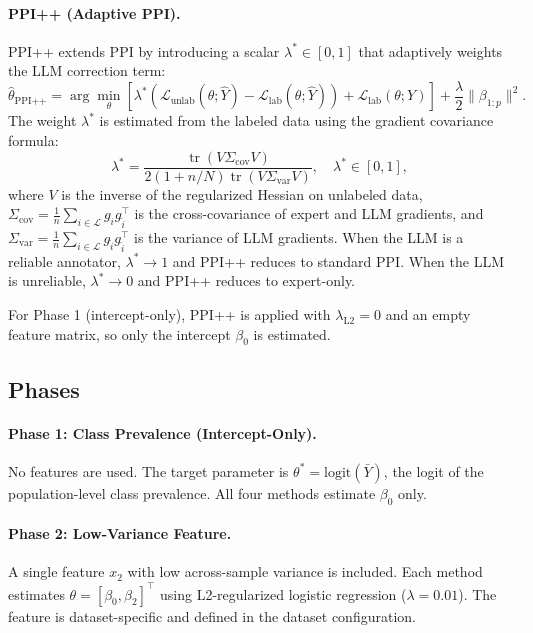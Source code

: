 \paragraph{PPI++ (Adaptive PPI).}
PPI++ \citep{angelopoulos2023ppipp} extends PPI by introducing a scalar $\lambda^* \in [0,1]$ that adaptively weights the LLM correction term:
\[
    \hat{\theta}_{\text{PPI++}} = \arg\min_\theta \left[ \lambda^* (\mathcal{L}_{\text{unlab}}(\theta;\hat{Y}) - \mathcal{L}_{\text{lab}}(\theta;\hat{Y})) + \mathcal{L}_{\text{lab}}(\theta;Y) \right] + \frac{\lambda}{2}\|\beta_{1:p}\|^2.
\]
The weight $\lambda^*$ is estimated from the labeled data using the gradient covariance formula:
\[
    \lambda^* = \frac{\operatorname{tr}(V \Sigma_{\text{cov}} V)}{2(1 + n/N)\operatorname{tr}(V \Sigma_{\text{var}} V)},
    \quad \lambda^* \in [0, 1],
\]
where $V$ is the inverse of the regularized Hessian on unlabeled data, $\Sigma_{\text{cov}} = \frac{1}{n}\sum_{i \in \mathcal{L}} g_i g_{\hat{i}}^\top$ is the cross-covariance of expert and LLM gradients, and $\Sigma_{\text{var}} = \frac{1}{n}\sum_{i \in \mathcal{L}} g_{\hat{i}} g_{\hat{i}}^\top$ is the variance of LLM gradients. When the LLM is a reliable annotator, $\lambda^* \to 1$ and PPI++ reduces to standard PPI. When the LLM is unreliable, $\lambda^* \to 0$ and PPI++ reduces to expert-only.

For Phase 1 (intercept-only), PPI++ is applied with $\lambda_{\text{L2}} = 0$ and an empty feature matrix, so only the intercept $\beta_0$ is estimated.

\subsection{Phases}

\paragraph{Phase 1: Class Prevalence (Intercept-Only).}
No features are used. The target parameter is $\theta^* = \text{logit}(\bar{Y})$, the logit of the population-level class prevalence. All four methods estimate $\beta_0$ only.

\paragraph{Phase 2: Low-Variance Feature.}
A single feature $x_2$ with low across-sample variance is included. Each method estimates $\theta = [\beta_0, \beta_2]^\top$ using L2-regularized logistic regression ($\lambda = 0.01$). The feature is dataset-specific and defined in the dataset configuration.

